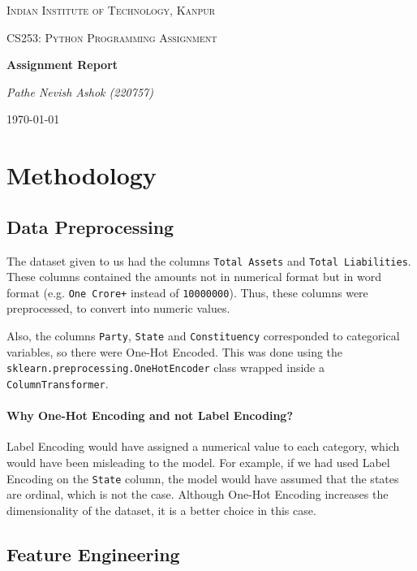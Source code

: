 \documentclass{article}
\begin{document}
\begin{titlepage}
    \centering
    {\scshape\LARGE Indian Institute of Technology, Kanpur \par}
    \vspace{1cm}
    {\scshape\Large CS253: Python Programming Assignment\par}
    \vspace{1.5cm}
    {\huge\bfseries Assignment Report\par}
    \vspace{2cm}
    {\Large\itshape Pathe Nevish Ashok (220757)\par}
    \vfill
    {\large \today\par}
\end{titlepage}

\section{Methodology}

\subsection{Data Preprocessing}

The dataset given to us had the columns \texttt{Total Assets} and \texttt{Total Liabilities}. These columns
contained the amounts not in numerical format but in word format (e.g. \texttt{One Crore+} instead of \texttt{10000000}).
Thus, these columns were preprocessed, to convert into numeric values.

Also, the columns \texttt{Party}, \texttt{State} and \texttt{Constituency} corresponded to
categorical variables, so there were One-Hot Encoded. This was done using the \texttt{sklearn.preprocessing.OneHotEncoder} \cite{scikit-learn} class wrapped inside a \texttt{ColumnTransformer}.

\paragraph*{Why One-Hot Encoding and not Label Encoding?}
{
    Label Encoding would have assigned a numerical value to each category, which would have been misleading to the model. For example, if we had used Label Encoding on the \texttt{State} column, the model would have assumed that the states are ordinal, which is not the case.
    Although One-Hot Encoding increases the dimensionality of the dataset, it is a better choice in this case.
}

\subsection{Feature Engineering}
\end{document}
